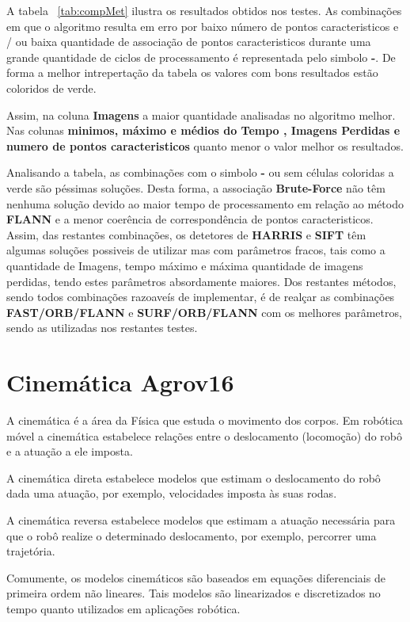 A tabela ~\ref{tab:compMet} ilustra os resultados obtidos nos testes. As combinações em que  o algoritmo resulta em erro por baixo número de pontos caracteristicos e / ou baixa quantidade de associação de pontos caracteristicos durante uma grande quantidade de ciclos de processamento é representada pelo simbolo \textbf{-}. De forma a melhor intrepertação da tabela os valores com bons resultados estão coloridos de verde. 

Assim, na coluna \textbf{Imagens} a maior quantidade analisadas no algoritmo melhor. Nas colunas \textbf{minimos, máximo e médios do Tempo , Imagens Perdidas e numero de pontos caracteristicos} quanto menor o valor melhor os resultados. 

Analisando a tabela, as combinações com o simbolo \textbf{-} ou sem células coloridas a verde são péssimas soluções. Desta forma, a associação \textbf{Brute-Force} não têm nenhuma solução devido ao maior tempo de processamento em relação ao método \textbf{FLANN} e a menor coerência de correspondência de pontos caracteristicos. Assim, das restantes combinações, os detetores de \textbf{HARRIS} e \textbf{SIFT} têm algumas soluções possiveis de utilizar mas com parâmetros fracos, tais como a quantidade de Imagens, tempo máximo e máxima quantidade de imagens perdidas, tendo estes parâmetros absordamente maiores. Dos restantes métodos, sendo todos combinações razoaveís de implementar, é de realçar as combinações \textbf{FAST/ORB/FLANN} e \textbf{SURF/ORB/FLANN} com os melhores parâmetros, sendo as utilizadas nos restantes testes.






\section{Cinemática Agrov16}

A cinemática é a área da Física que estuda o movimento dos corpos. Em robótica móvel a cinemática estabelece relações entre o deslocamento (locomoção) do robô e a atuação a ele imposta.

A cinemática direta estabelece modelos que estimam o deslocamento do robô dada uma atuação, por exemplo, velocidades imposta às suas rodas. 

A cinemática reversa estabelece modelos que estimam a atuação necessária para que o robô realize o determinado deslocamento, por exemplo, percorrer uma trajetória.

Comumente, os modelos cinemáticos são baseados em equações diferenciais de primeira ordem não lineares. Tais modelos são linearizados e discretizados no tempo quanto utilizados em aplicações robótica.



